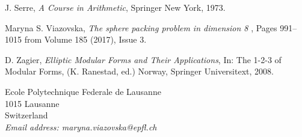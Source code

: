 \begin{thebibliography}{20}
 {\sc J. Serre}, {\em A Course in Arithmetic}, Springer New York, 1973.




 {\sc Maryna S. Viazovska}, {\em The sphere packing problem in dimension 8	},
Pages 991--1015 from Volume 185 (2017), Issue 3.

 {\sc D. Zagier}, {\em Elliptic Modular Forms and Their Applications}, In:  The 1-2-3 of Modular Forms, (K. Ranestad, ed.) Norway, Springer Universitext, 2008.
\end{thebibliography}

\newpage

{\footnotesize
\noindent
Ecole Polytechnique Federale de Lausanne\\
1015 Lausanne\\
Switzerland\\
{\it Email address: maryna.viazovska@epfl.ch}}